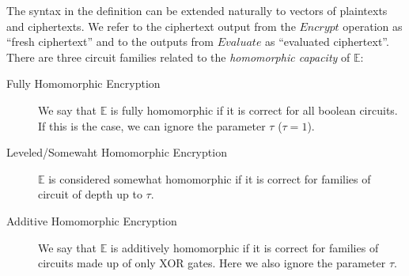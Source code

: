 The syntax in the definition can be extended naturally to vectors of plaintexts
and ciphertexts. We refer to the ciphertext output from the \(Encrypt\)
operation as ``fresh ciphertext'' and to the outputs from \(Evaluate\) as ``evaluated
ciphertext''. There are three circuit families related to the \textit{homomorphic capacity } of \(\mathbb{E}\):
\begin{description}
\item[Fully Homomorphic Encryption] We say that \(\mathbb{E}\) is fully
  homomorphic if it is correct for all boolean circuits. If this is the case, we can
  ignore the parameter \(\tau\) (\(\tau = 1\)).
\item[Leveled/Somewaht Homomorphic Encryption] \(\mathbb{E}\) is considered
  somewhat homomorphic if it is correct for families of circuit of depth up to
  \(\tau\).
\item[Additive Homomorphic Encryption] We say that \(\mathbb{E}\) is additively
  homomorphic if it is correct for families of circuits made up of only XOR
  gates. Here we also ignore the parameter \(\tau\).
\end{description}


